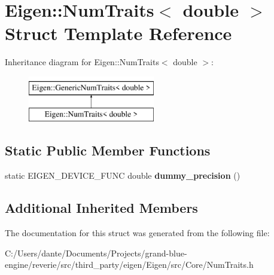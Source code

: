 \hypertarget{struct_eigen_1_1_num_traits_3_01double_01_4}{}\section{Eigen\+::Num\+Traits$<$ double $>$ Struct Template Reference}
\label{struct_eigen_1_1_num_traits_3_01double_01_4}
Inheritance diagram for Eigen\+::Num\+Traits$<$ double $>$\+:\begin{figure}[H]
\begin{center}
\leavevmode
\includegraphics[height=2.000000cm]{struct_eigen_1_1_num_traits_3_01double_01_4}
\end{center}
\end{figure}
\subsection*{Static Public Member Functions}
\begin{DoxyCompactItemize}
\item 
\mbox{\label{struct_eigen_1_1_num_traits_3_01double_01_4_ad123052aa1b3780ae4898fd2aa24c1d7}} 
static E\+I\+G\+E\+N\+\_\+\+D\+E\+V\+I\+C\+E\+\_\+\+F\+U\+NC double {\bfseries dummy\+\_\+precision} ()
\end{DoxyCompactItemize}
\subsection*{Additional Inherited Members}


The documentation for this struct was generated from the following file\+:\begin{DoxyCompactItemize}
\item 
C\+:/\+Users/dante/\+Documents/\+Projects/grand-\/blue-\/engine/reverie/src/third\+\_\+party/eigen/\+Eigen/src/\+Core/Num\+Traits.\+h\end{DoxyCompactItemize}
